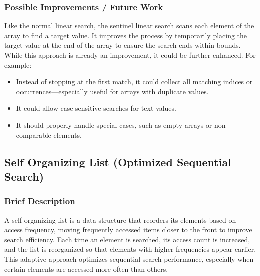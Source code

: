 \documentclass{article}
\begin{document}
\subsubsection*{Possible Improvements / Future Work}    
Like the normal linear search, the sentinel linear search scans each element of the array to find a target value. It improves the process by temporarily placing the target value at the end of the array to ensure the search ends within bounds. While this approach is already an improvement, it could be further enhanced. For example:
\begin{itemize}
    \item Instead of stopping at the first match, it could collect all matching indices or occurrences—especially useful for arrays with duplicate values.
    \item It could allow case-sensitive searches for text values.
    \item It should properly handle special cases, such as empty arrays or non-comparable elements.
\end{itemize}




\subsection{Self Organizing List (Optimized Sequential Search)}
\subsubsection*{Brief Description}
A self-organizing list is a data structure that reorders its elements based on access frequency, moving frequently accessed items closer to the front to improve search efficiency. Each time an element is searched, its access count is increased, and the list is reorganized so that elements with higher frequencies appear earlier. This adaptive approach optimizes sequential search performance, especially when certain elements are accessed more often than others.
\end{document}
